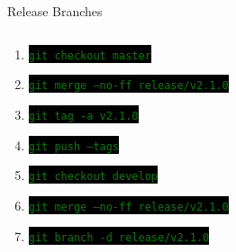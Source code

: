 \documentclass[
14pt,
aspectratio=169,
usenames,
dvipsnames,
x11names]{beamer}
\newcommand{\code}[1]{{\small\setlength{\fboxsep}{2pt}\colorbox{black}{\textcolor{green}{\texttt{#1}}}}}
\begin{document}
\begin{frame}{Release Branches}
\begin{columns}
\begin{column}{.65\linewidth}
\begin{enumerate}[<+->]
      \item \code{git checkout master}
      \item \code{git merge --no-ff release/v2.1.0}
      \item \code{git tag -a v2.1.0}
      \item \code{git push --tags}
      \item \code{git checkout develop}
      \item \code{git merge --no-ff release/v2.1.0}
      \item \code{git branch -d release/v2.1.0}
      \end{enumerate}
      \endminipage
    \end{column}
  \end{columns}
\end{frame}
\end{document}
